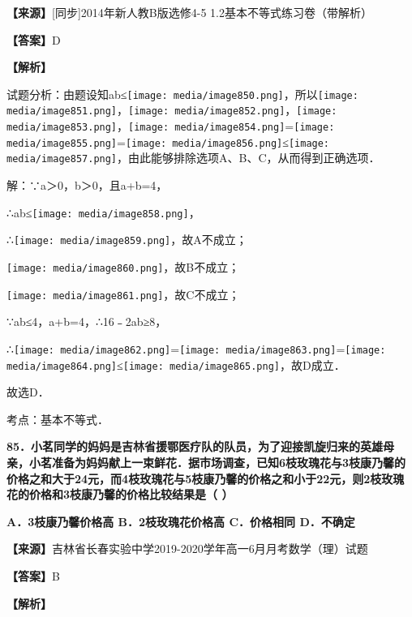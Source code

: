 \textbf{【来源】}{[}同步{]}2014年新人教B版选修4-5
1.2基本不等式练习卷（带解析）

\textbf{【答案】}D

\textbf{【解析】}

试题分析：由题设知ab≤\texttt{[image: media/image850.png]}，所以\texttt{[image: media/image851.png]}，\texttt{[image: media/image852.png]}，\texttt{[image: media/image853.png]}，\texttt{[image: media/image854.png]}=\texttt{[image: media/image855.png]}=\texttt{[image: media/image856.png]}≤\texttt{[image: media/image857.png]}，由此能够排除选项A、B、C，从而得到正确选项．

解：∵a＞0，b＞0，且a+b=4，

∴ab≤\texttt{[image: media/image858.png]}，

∴\texttt{[image: media/image859.png]}，故A不成立；

\texttt{[image: media/image860.png]}，故B不成立；

\texttt{[image: media/image861.png]}，故C不成立；

∵ab≤4，a+b=4，∴16﹣2ab≥8，

∴\texttt{[image: media/image862.png]}=\texttt{[image: media/image863.png]}=\texttt{[image: media/image864.png]}≤\texttt{[image: media/image865.png]}，故D成立．

故选D．

考点：基本不等式．

\textbf{85．小茗同学的妈妈是吉林省援鄂医疗队的队员，为了迎接凯旋归来的英雄母亲，小茗准备为妈妈献上一束鲜花．据市场调查，已知6枝玫瑰花与3枝康乃馨的价格之和大于24元，而4枝玫瑰花与5枝康乃馨的价格之和小于22元，则2枝玫瑰花的价格和3枝康乃馨的价格比较结果是（
）}

\textbf{A．3枝康乃馨价格高 B．2枝玫瑰花价格高 C．价格相同 D．不确定}

\textbf{【来源】}吉林省长春实验中学2019-2020学年高一6月月考数学（理）试题

\textbf{【答案】}B

\textbf{【解析】}

